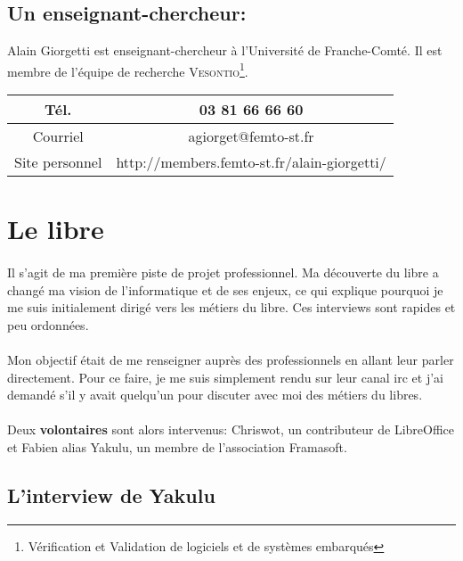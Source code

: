 \documentclass[a4paper,12pt, draft]{report}
\begin{document}
\subsection[Un enseignant-chercheur]{Un enseignant-chercheur:  }
Alain Giorgetti est enseignant-chercheur à l'Université de Franche-Comté. Il est membre de l'équipe de recherche \textsc{Vesontio}\footnote{Vérification et Validation de logiciels et de systèmes embarqués}.\\

\begin{tabular}{c|c}

    Tél. & 03 81 66 66 60\\
\hline
    Courriel & agiorget@femto-st.fr\\
\hline
    Site personnel & http://members.femto-st.fr/alain-giorgetti/\\

\end{tabular}

\section{Le libre}
\paragraph{}
Il s'agit de ma première piste de projet professionnel. Ma découverte du libre a changé ma vision de l'informatique et de ses enjeux, ce qui explique pourquoi je me suis initialement dirigé vers les métiers du libre. Ces interviews sont rapides et peu ordonnées.

\paragraph{}
Mon objectif était de me renseigner auprès des professionnels en allant leur parler directement. Pour ce faire, je me suis simplement rendu sur leur canal irc et j'ai demandé s'il y avait quelqu'un pour discuter avec moi des métiers du libres. 

\paragraph{}
Deux \textbf{volontaires} sont alors intervenus: Chriswot, un contributeur de LibreOffice et Fabien alias Yakulu, un membre de l'association Framasoft.


\subsection{L'interview de Yakulu}
\end{document}
